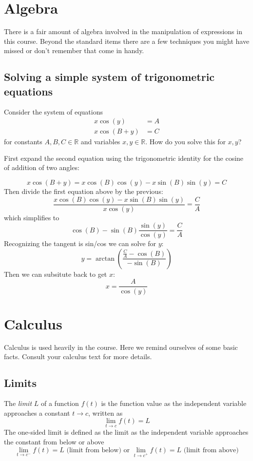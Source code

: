 \section{Algebra}

There is a fair amount of algebra involved in the manipulation of expressions in this course. Beyond the standard items there are a few techniques you might have missed or don't remember that come in handy.

\subsection*{Solving a simple system of trigonometric equations}

Consider the system of equations
\begin{align*}
  x \cos(y) &= A\\
  x \cos(B + y) &= C
\end{align*}
for constants $A,B,C \in \mathbb{R}$ and variables $x,y\in\mathbb{R}$. How do you solve this for $x,y$?

First expand the second equation using the trigonometric identity for the cosine of addition of two angles:

\[
x \cos(B + y) = x \cos(B)\cos(y) - x \sin(B)\sin(y) = C
\]
Then divide the first equation above by the previous:
\[
\frac{x \cos(B)\cos(y) - x \sin(B)\sin(y)}{x \cos(y)} = \frac{C}{A}
\]
which simplifies to
\[
\cos(B) - \sin(B)\frac{\sin(y)}{\cos(y)} = \frac{C}{A}
\]
Recognizing the tangent is sin/cos we can solve for $y$:
\[
y = \arctan\left(\frac{\frac{C}{A}-\cos(B)}{-\sin(B)}\right)
\]
Then we can subsitute back to get $x$:
\[
x = \frac{A}{\cos(y)}
\]


\section{Calculus}

Calculus is used heavily in the course. Here we remind ourselves of some basic facts. Consult your calculus text for more details.

\subsection*{Limits}

The \textit{limit} $L$ of a function $f(t)$ is the function value as the independent variable approaches a constant $t\rightarrow c$, written as
\[
\lim_{t\rightarrow c} f(t) = L
\]
The one-sided limit is defined as the limit as the independent variable approaches the constant from below or above
\[
\lim_{t\rightarrow c^-} f(t) = L \mbox{ (limit from below) or } \lim_{t\rightarrow c^+} f(t) = L \mbox{ (limit from above)}
\]

